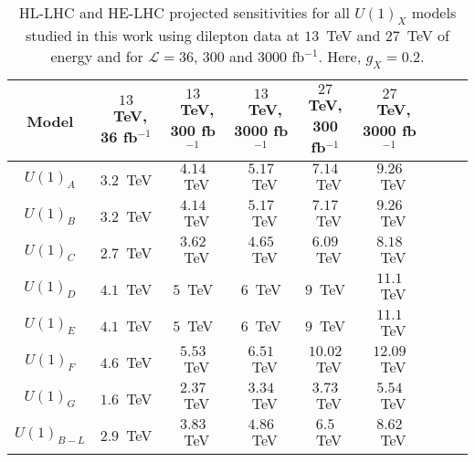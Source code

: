 \begin{table*}[!t]
\centering
\small\begin{tabular}{ccccccccc}
\hline 
Model & $13$~TeV, 36 fb$^{-1}$ & $13$~TeV, 300 fb$^{-1}$ &  $13$~TeV, 3000 fb$^{-1}$ & $27$ TeV, 300 fb$^{-1}$  & $27$~TeV, 3000 fb$^{-1}$\\ \hline 
$U(1)_A$ & $3.2$~TeV & $4.14$~TeV & $5.17$~TeV & $7.14$~TeV & $9.26$~TeV \\
$U(1)_B$ & $3.2$~TeV & $4.14$~TeV & $5.17$~TeV & $7.17$~TeV & $9.26$~TeV \\
$U(1)_C$ & $2.7$~TeV & $3.62$~TeV & $4.65$~TeV & $6.09$~TeV & $8.18$~TeV \\
$U(1)_D$ & $4.1$~TeV & $5$~TeV & $6$~TeV & $9$~TeV & $11.1$~TeV \\
$U(1)_E$ & $4.1$~TeV & $5$~TeV & $6$~TeV & $9$~TeV & $11.1$~TeV \\
$U(1)_F$ & $4.6$~TeV & $5.53$~TeV & $6.51$~TeV & $10.02$~TeV & $12.09$~TeV \\
$U(1)_G$ & $1.6$~TeV & $2.37$~TeV & $3.34$~TeV & $3.73$~TeV & $5.54$~TeV \\
$U(1)_{B-L}$ & $2.9$~TeV & $3.83$~TeV & $4.86$~TeV & $6.5$~TeV  & $8.62$~TeV \\
\hline
\end{tabular}\normalsize
\caption{HL-LHC and HE-LHC projected sensitivities for all $U(1)_X$ models studied in this work
using dilepton data at $13$~TeV and $27$~TeV of \com energy and for $\mathcal{L}=36$, 300 and 3000 fb$^{-1}$. Here, $g_X =0.2$.}
\label{tab:LHCforcast2}
\end{table*}

